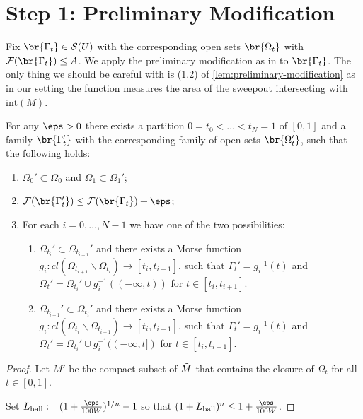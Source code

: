 \section{Step 1: Preliminary Modification}
Fix $\br{\Gamma_t} \in \mathcal{S}(U)$ with the corresponding open sets $\br{\Omega_t}$ with $\mathcal{F}(\br{\Gamma_t}) \leq A$. We apply the preliminary modification as in \cite[Lemma 6.2]{CL20} to $\br{\Gamma_t}$. The only thing we should be careful with is (1.2) of \ref{lem:preliminary-modification} as in our setting the function measures the area of the sweepout intersecting with $\text{int}(M)$. 
\begin{lemma}\label{lem:preliminary-modification}
    For any $\eps > 0$ there exists a partition $0 = t_0 < \dots < t_N = 1$ of $[0, 1]$ and a family $\br{\Gamma_t'}$ with the corresponding family of open sets $\br{\Omega_t'}$, such that the following holds:
    \begin{enumerate}
        \item[(1.1)] $\Omega_0' \subset \Omega_0$ and $\Omega_1 \subset \Omega_1'$;

        \item[(1.2)] $\mathcal{F}(\br{\Gamma_t'}) \leq \mathcal{F}(\br{\Gamma_t}) + \eps$; 
        \item[(1.3)] For each $i = 0, \dots, N - 1$ we have one of the two possibilities:
        \begin{enumerate}
            \item[(A)] $\Omega_{t_i}' \subset \Omega_{t_{i + 1}}'$ and there exists a Morse function $g_i: cl(\Omega_{t_{i + 1}}\backslash \Omega_{t_i}) \to [t_i, t_{i + 1}]$, such that $\Gamma_t' = g_i^{-1}(t)$ and $\Omega_t' = \Omega_{t_i}'\cup g_i^{-1}((-\infty, t))$ for $t \in [t_i, t_{i + 1}]$. 
            \item[(B)] $\Omega_{t_{i + 1}}' \subset \Omega_{t_i}'$ and there exists a Morse function $g_i: cl(\Omega_{t_i}\backslash\Omega_{t_{i + 1}}) \to [t_i, t_{i + 1}]$, such that $\Gamma_t' = g_i^{-1}(t)$ and $\Omega_t' = \Omega_{t_i}'\cup g_i^{-1}((-\infty, t])$ for $t \in [t_i, t_{i + 1}]$. 
        \end{enumerate}
    \end{enumerate}
    \begin{proof}
        Let $M'$ be the compact subset of $\Tilde{M}$ that contains the closure of $\Omega_t$ for all $t \in [0, 1]$.

        Set $L_{\mathrm{ball}}:=(1+\frac{\eps}{100W})^{1/n}-1$ so that $(1+L_{\mathrm{ball}})^n\le 1+\frac{\eps}{100W}$.


\end{proof}
\end{lemma}
